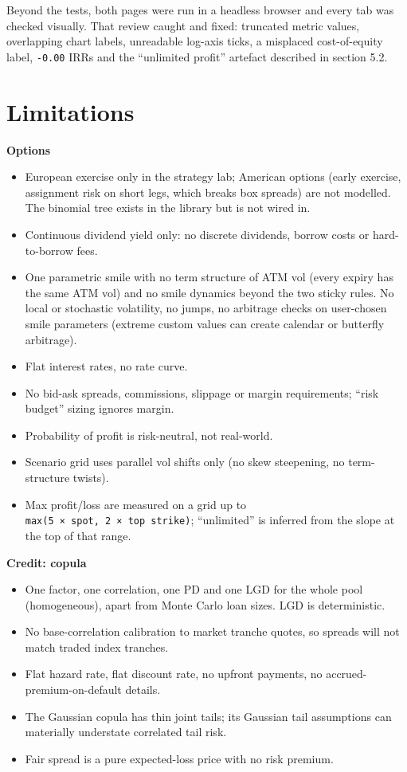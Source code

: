 \documentclass[10pt,a4paper]{article}
\providecommand{\tightlist}{\setlength{\itemsep}{1pt}\setlength{\parskip}{0pt}}
\numberwithin{equation}{section}
\begin{document}
Beyond the tests, both pages were run in a headless browser and every tab was checked visually. That review caught and fixed: truncated metric values, overlapping chart labels, unreadable log-axis ticks, a misplaced cost-of-equity label, \texttt{-0.00} IRRs and the ``unlimited profit'' artefact described in section 5.2.

\section{Limitations}\label{limitations}

\textbf{Options}

\begin{itemize}
\tightlist
\item
  European exercise only in the strategy lab; American options (early exercise, assignment risk on short legs, which breaks box spreads) are not modelled. The binomial tree exists in the library but is not wired in.
\item
  Continuous dividend yield only: no discrete dividends, borrow costs or hard-to-borrow fees.
\item
  One parametric smile with no term structure of ATM vol (every expiry has the same ATM vol) and no smile dynamics beyond the two sticky rules. No local or stochastic volatility, no jumps, no arbitrage checks on user-chosen smile parameters (extreme custom values can create calendar or butterfly arbitrage).
\item
  Flat interest rates, no rate curve.
\item
  No bid-ask spreads, commissions, slippage or margin requirements; ``risk budget'' sizing ignores margin.
\item
  Probability of profit is risk-neutral, not real-world.
\item
  Scenario grid uses parallel vol shifts only (no skew steepening, no term-structure twists).
\item
  Max profit/loss are measured on a grid up to \texttt{max(5\ ×\ spot,\ 2\ ×\ top\ strike)}; ``unlimited'' is inferred from the slope at the top of that range.
\end{itemize}

\textbf{Credit: copula}

\begin{itemize}
\tightlist
\item
  One factor, one correlation, one PD and one LGD for the whole pool (homogeneous), apart from Monte Carlo loan sizes. LGD is deterministic.
\item
  No base-correlation calibration to market tranche quotes, so spreads will not match traded index tranches.
\item
  Flat hazard rate, flat discount rate, no upfront payments, no accrued-premium-on-default details.
\item
  The Gaussian copula has thin joint tails; its Gaussian tail assumptions can materially understate correlated tail risk.
\item
  Fair spread is a pure expected-loss price with no risk premium.
\end{itemize}
\end{document}
